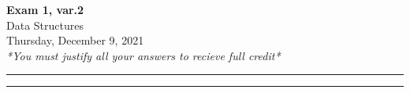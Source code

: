 \documentclass[a4paper,12pt]{article}
\begin{document}
\begin{center}
{\bf\Huge Exam 1, var.2} \\[5pt]
Data Structures \\
Thursday, December 9, 2021\\[5pt]
\textit{*You must justify all your answers to recieve full credit*}
\end{center}

\hrule
\vspace{2pt}
\hrule
\vspace{12pt}






\end{document}
